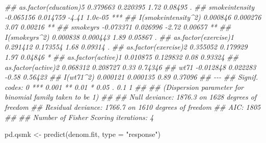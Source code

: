 \documentclass[
  10pt,
  a4paper,
]{book}
\newenvironment{Shaded}{\begin{snugshade}}{\end{snugshade}}
\newcommand{\AttributeTok}[1]{\textcolor[rgb]{0.40,0.45,0.13}{#1}}
\newcommand{\DocumentationTok}[1]{\textcolor[rgb]{0.37,0.37,0.37}{\textit{#1}}}
\newcommand{\FunctionTok}[1]{\textcolor[rgb]{0.28,0.35,0.67}{#1}}
\newcommand{\NormalTok}[1]{\textcolor[rgb]{0.00,0.46,0.62}{#1}}
\newcommand{\OtherTok}[1]{\textcolor[rgb]{0.00,0.46,0.62}{#1}}
\newcommand{\StringTok}[1]{\textcolor[rgb]{0.13,0.47,0.30}{#1}}
\begin{document}
\begin{Shaded}
\begin{Highlighting}[]
\DocumentationTok{\#\# as.factor(education)5  0.379663   0.220395    1.72  0.08495 .  }
\DocumentationTok{\#\# smokeintensity        {-}0.065156   0.014759   {-}4.41  1.0e{-}05 ***}
\DocumentationTok{\#\# I(smokeintensity\^{}2)    0.000846   0.000276    3.07  0.00216 ** }
\DocumentationTok{\#\# smokeyrs              {-}0.073371   0.026996   {-}2.72  0.00657 ** }
\DocumentationTok{\#\# I(smokeyrs\^{}2)          0.000838   0.000443    1.89  0.05867 .  }
\DocumentationTok{\#\# as.factor(exercise)1   0.291412   0.173554    1.68  0.09314 .  }
\DocumentationTok{\#\# as.factor(exercise)2   0.355052   0.179929    1.97  0.04846 *  }
\DocumentationTok{\#\# as.factor(active)1     0.010875   0.129832    0.08  0.93324    }
\DocumentationTok{\#\# as.factor(active)2     0.068312   0.208727    0.33  0.74346    }
\DocumentationTok{\#\# wt71                  {-}0.012848   0.022283   {-}0.58  0.56423    }
\DocumentationTok{\#\# I(wt71\^{}2)              0.000121   0.000135    0.89  0.37096    }
\DocumentationTok{\#\# {-}{-}{-}}
\DocumentationTok{\#\# Signif. codes:  0 \textquotesingle{}***\textquotesingle{} 0.001 \textquotesingle{}**\textquotesingle{} 0.01 \textquotesingle{}*\textquotesingle{} 0.05 \textquotesingle{}.\textquotesingle{} 0.1 \textquotesingle{} \textquotesingle{} 1}
\DocumentationTok{\#\# }
\DocumentationTok{\#\# (Dispersion parameter for binomial family taken to be 1)}
\DocumentationTok{\#\# }
\DocumentationTok{\#\#     Null deviance: 1876.3  on 1628  degrees of freedom}
\DocumentationTok{\#\# Residual deviance: 1766.7  on 1610  degrees of freedom}
\DocumentationTok{\#\# AIC: 1805}
\DocumentationTok{\#\# }
\DocumentationTok{\#\# Number of Fisher Scoring iterations: 4}

\NormalTok{pd.qsmk }\OtherTok{\textless{}{-}} \FunctionTok{predict}\NormalTok{(denom.fit, }\AttributeTok{type =} \StringTok{"response"}\NormalTok{)}


\end{Highlighting}
\end{Shaded}
\end{document}
